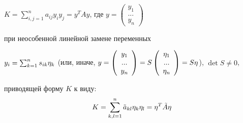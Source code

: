 \noindent $K=\sum _{i,j=1}^{n}a_{ij} y_{i} y_{j}  =y^{T} Ay$,   где    $y=\left(\begin{array}{c} {y_{1} } \\ {...} \\ {y_{n} } \end{array}\right)$

\noindent при неособенной линейной замене переменных

\noindent $y_{i} =\sum _{k=1}^{n}s_{ik} {\rm \eta }_{k}  $   (или, иначе, $y=\left(\begin{array}{c} {y_{1} } \\ {...} \\ {y_{n} } \end{array}\right)=S\left(\begin{array}{c} {{\rm \eta }_{1} } \\ {...} \\ {{\rm \eta }_{n} } \end{array}\right)=S{\rm \eta }$),   $\det S\ne 0$,

\noindent приводящей форму $K$ к виду:
\[K=\sum _{k,l=1}^{n}\tilde{a}_{kl} {\rm \eta }_{k} {\rm \eta }_{l}  ={\rm \eta }^{T} \tilde{A}{\rm \eta }\]

